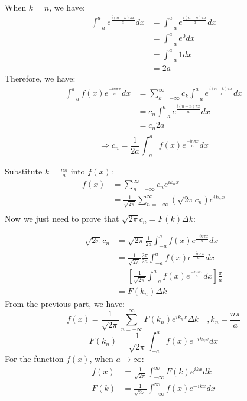 \documentclass{article}
\begin{document}
When \(k = n\), we have:
\begin{align*}
	\int_{-a}^{a} e^\frac{i (n - k) \pi x}{a } dx & = \int_{-a}^{a} e^\frac{i (n - n) \pi x}{a } dx \\
	                                              & = \int_{-a}^{a} e^0 dx                          \\
	                                              & = \int_{-a}^{a} 1 dx                            \\
	                                              & = 2a
\end{align*}
Therefore, we have:
\begin{align*}
	\int_{-a}^{a} f(x) e^{\frac{- i n \pi x}{a}} dx & = \sum_{k = -\infty}^{\infty} c_k \int_{-a}^{a} e^\frac{i (n - k) \pi x}{a } dx \\
	                                                & = c_n \int_{-a}^{a} e^\frac{i (n - n) \pi x}{a } dx                             \\
	                                                & = c_n 2a                                                                        \\
\end{align*}
\[\Rightarrow c_n = \frac{1}{2a} \int_{-a}^{a} f(x) e^{\frac{- i n \pi x}{a}} dx\]

Substitute \(k = \frac{n \pi}{a}\) into \(f(x)\):
\begin{align*}
	f(x) & = \sum_{n = -\infty}^{\infty} c_n e^{i k_n x}                                       \\
	     & = \frac{1}{\sqrt{2 \pi}} \sum_{n = -\infty}^{\infty} (\sqrt{2 \pi} c_n) e^{i k_n x} \\
\end{align*}
Now we just need to prove that \(\sqrt{2 \pi} c_n = F(k) \Delta k\):

\begin{align*}
	\sqrt{2 \pi} c_n & = \sqrt{2 \pi} \frac{1}{2a} \int_{-a}^{a} f(x) e^{\frac{- i n \pi x}{a}} dx                         \\
	                 & = \frac{1}{\sqrt{2 \pi}} \frac{2 \pi}{2 a} \int_{-a}^{a} f(x) e^{\frac{- i n \pi x}{a}} dx          \\
	                 & = \left[\frac{1}{\sqrt{2 \pi}} \int_{-a}^{a} f(x) e^{\frac{- i n \pi x}{a}} dx\right] \frac{\pi}{a} \\
	                 & = F(k_n) \Delta k
\end{align*}
From the previous part, we have:
\[f(x) = \frac{1}{\sqrt{2 \pi}} \sum_{n = - \infty}^{\infty} F(k_n)e^{ik_n x} \Delta k \quad , k_n = \frac{n \pi}{a}\]
\[F(k_n) = \frac{1}{\sqrt{2 \pi}} \int_{-a}^{a} f(x) e^{-i k_n x} dx\]
For the function \(f(x)\), when \(a \rightarrow \infty\):
\begin{align*}
	f(x) & = \frac{1}{\sqrt{2 \pi}} \int_{-\infty}^{\infty} F(k) e^{i k x} dk  \\
	F(k) & = \frac{1}{\sqrt{2 \pi}} \int_{-\infty}^{\infty} f(x) e^{-i k x} dx
\end{align*}
\end{document}
